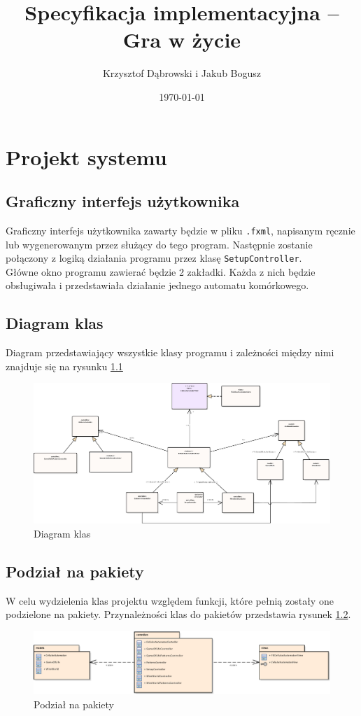 \documentclass{report}
\title{Specyfikacja implementacyjna -- Gra w życie}
\author{Krzysztof Dąbrowski i Jakub Bogusz}
\date{\today}
\begin{document}
\maketitle{}

\tableofcontents{}

\chapter{Projekt systemu}

\section{Graficzny interfejs użytkownika}
Graficzny interfejs użytkownika zawarty będzie w pliku \texttt{.fxml}, napisanym ręcznie lub wygenerowanym przez służący do tego program. Następnie zostanie połączony z logiką działania programu przez klasę \texttt{SetupController}. \\
Główne okno programu zawierać będzie 2 zakładki. Każda z nich będzie obsługiwała i przedstawiała działanie jednego automatu komórkowego.

\section{Diagram klas}
Diagram przedstawiający wszystkie klasy programu i zależności między nimi znajduje się na rysunku \ref{fig:wszystkie_klasy}
\begin{figure}
	\hspace*{-3cm}\includegraphics[width=18cm]{Diagram_klas_calosc}
	\caption{Diagram klas}
	\label{fig:wszystkie_klasy}
\end{figure}

\section{Podział na pakiety}
W celu wydzielenia klas projektu względem funkcji, które pełnią zostały one podzielone na pakiety. Przynależności klas do pakietów przedstawia rysunek \ref{fig:pakiety}.
\begin{figure}
	\hspace*{-3cm}\includegraphics[width=18cm]{Pakiety}
	\caption{Podział na pakiety}
	\label{fig:pakiety}
\end{figure}
\end{document}
